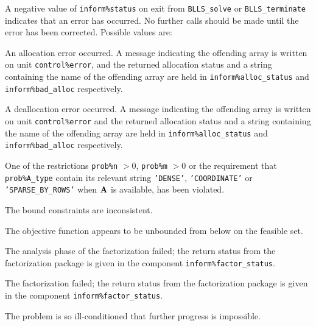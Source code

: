 \documentclass{galahad}
\newcommand{\packagename}{BLLS}
\begin{document}

\galerrors
A negative value of {\tt inform\%status} on exit from
{\tt \packagename\_solve}
or
{\tt \packagename\_terminate}
indicates that an error has occurred. No further calls should be made
until the error has been corrected. Possible values are:

\begin{description}

 An allocation error occurred. A message indicating
the offending
array is written on unit {\tt control\%error}, and the returned allocation
status and a string containing the name of the offending array
are held in {\tt inform\%alloc\_\-status}
and {\tt inform\%bad\_alloc} respectively.

 A deallocation error occurred.
A message indicating the offending
array is written on unit {\tt control\%error} and the returned allocation
status and a string containing the name of the offending array
are held in {\tt inform\%alloc\_\-status}
and {\tt inform\%bad\_alloc} respectively.

 One of the restrictions
 {\tt prob\%n} $> 0$,
 {\tt prob\%m} $> 0$
    or the requirement that
    {\tt prob\%A\_type} contain its relevant string
    {\tt 'DENSE'}, {\tt 'COORDINATE'} or {\tt 'SPARSE\_BY\_ROWS'}
    when ${\mathbf{A}}$ is available,  has been violated.


 The bound constraints are inconsistent.

 The objective function appears to be unbounded
  from below on the feasible set.

 The analysis phase of the factorization failed;
  the return status from the factorization
    package is given in the component {\tt inform\%fac\-t\-or\_status}.

 The factorization failed; the return status
  from the factorization
    package is given in the component {\tt inform\%fac\-t\-or\_status}.

 The problem is so ill-conditioned that
 further progress is impossible.


\end{description}
\end{document}
